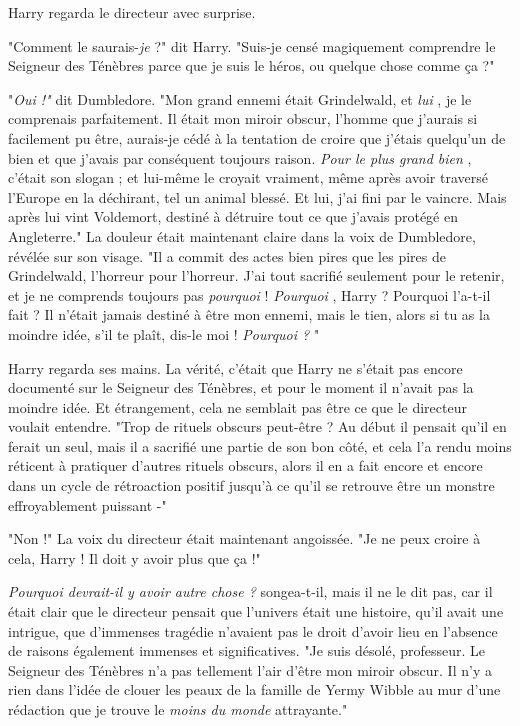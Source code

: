 Harry regarda le directeur avec surprise.

"Comment le saurais-\emph{je}  ?" dit Harry. "Suis-je censé magiquement comprendre le Seigneur des Ténèbres parce que je suis le héros, ou quelque chose comme ça ?"

"\emph{Oui !"}  dit Dumbledore. "Mon grand ennemi était Grindelwald, et \emph{lui} , je le comprenais parfaitement. Il était mon miroir obscur, l'homme que j'aurais si facilement pu être, aurais-je cédé à la tentation de croire que j'étais quelqu'un de bien et que j'avais par conséquent toujours raison. \emph{Pour le plus grand bien} , c'était son slogan ; et lui-même le croyait vraiment, même après avoir traversé l'Europe en la déchirant, tel un animal blessé. Et lui, j'ai fini par le vaincre. Mais après lui vint Voldemort, destiné à détruire tout ce que j'avais protégé en Angleterre." La douleur était maintenant claire dans la voix de Dumbledore, révélée sur son visage. "Il a commit des actes bien pires que les pires de Grindelwald, l'horreur pour l'horreur. J'ai tout sacrifié seulement pour le retenir, et je ne comprends toujours pas \emph{pourquoi}  ! \emph{Pourquoi} , Harry ? Pourquoi l'a-t-il fait ? Il n'était jamais destiné à être mon ennemi, mais le tien, alors si tu as la moindre idée, s'il te plaît, dis-le moi ! \emph{Pourquoi ?} "

Harry regarda ses mains. La vérité, c'était que Harry ne s'était pas encore documenté sur le Seigneur des Ténèbres, et pour le moment il n'avait pas la moindre idée. Et étrangement, cela ne semblait pas être ce que le directeur voulait entendre. "Trop de rituels obscurs peut-être ? Au début il pensait qu'il en ferait un seul, mais il a sacrifié une partie de son bon côté, et cela l'a rendu moins réticent à pratiquer d'autres rituels obscurs, alors il en a fait encore et encore dans un cycle de rétroaction positif jusqu'à ce qu'il se retrouve être un monstre effroyablement puissant -"

"Non !" La voix du directeur était maintenant angoissée. "Je ne peux croire à cela, Harry ! Il doit y avoir plus que ça !"

\emph{Pourquoi devrait-il y avoir autre chose ?}  songea-t-il, mais il ne le dit pas, car il était clair que le directeur pensait que l'univers était une histoire, qu'il avait une intrigue, que d'immenses tragédie n'avaient pas le droit d'avoir lieu en l'absence de raisons également immenses et significatives. "Je suis désolé, professeur. Le Seigneur des Ténèbres n'a pas tellement l'air d'être mon miroir obscur. Il n'y a rien dans l'idée de clouer les peaux de la famille de Yermy Wibble au mur d'une rédaction que je trouve le \emph{moins du monde}  attrayante."

